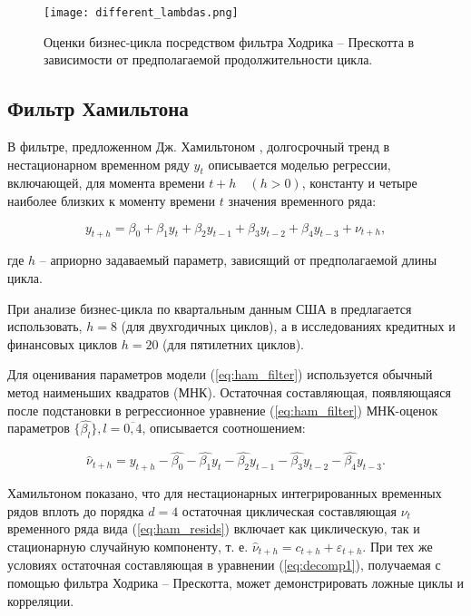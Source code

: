 \documentclass[a4paper,14pt]{extreport}
\begin{document}
	\begin{figure}
		\texttt{[image: different\_lambdas.png]}
		\caption{Оценки бизнес-цикла посредством фильтра Ходрика -- Прескотта в зависимости от предполагаемой продолжительности цикла.}
		\label{fig:different_lambda}
	\end{figure} 	
	
	\subsection{Фильтр Хамильтона}
	
	В фильтре, предложенном Дж. Хамильтоном \cite{hamHP}, долгосрочный тренд в нестационарном временном ряду $y_t$ описывается моделью регрессии, включающей, для момента времени $t+h \quad (h>0)$, константу и четыре наиболее близких к моменту времени $t$ значения временного ряда: 
	
	\begin{equation}
		y_{t+h} = \beta_0 + \beta_1 y_t + \beta_2 y_{t-1} 
		+ \beta_3 y_{t-2} + \beta_4 y_{t-3} + \nu_{t+h} ,
		\label{eq:ham_filter}
	\end{equation}
	
	где $h$ -- априорно задаваемый параметр, зависящий от предполагаемой длины цикла. 
	
	При анализе бизнес-цикла по квартальным данным США в \cite{hamHP} предлагается использовать, $h=8$ (для двухгодичных циклов), а в исследованиях кредитных и финансовых циклов $h=20$ (для пятилетних циклов).
	
	Для оценивания параметров модели (\ref{eq:ham_filter}) используется обычный метод наименьших квадратов (МНК). Остаточная составляющая, появляющаяся после подстановки в регрессионное уравнение (\ref{eq:ham_filter}) МНК-оценок параметров $\{\hat{\beta_l}\}, l=\overline{0,4}$, описывается соотношением:
	
	\begin{equation}
		\hat{\nu}_{t+h} = y_{t+h} - \hat{\beta_0} - \hat{\beta_1} y_t 
		- \hat{\beta_2} y_{t-1} - \hat{\beta_3} y_{t-2} - \hat{\beta_4} y_{t-3} .
		\label{eq:ham_resids}
	\end{equation}	
	
	Хамильтоном показано, что для нестационарных интегрированных временных рядов вплоть до порядка $d=4$ остаточная циклическая составляющая $\nu_t$ временного ряда вида (\ref{eq:ham_resids}) включает как циклическую, так и стационарную случайную компоненту, т. е. $\hat{\nu}_{t+h}=c_{t+h} + \varepsilon_{t+h}$. При тех же условиях остаточная составляющая в уравнении (\ref{eq:decomp1}), получаемая с помощью фильтра Ходрика -- Прескотта, может демонстрировать ложные циклы и корреляции. 
	
\end{document}
